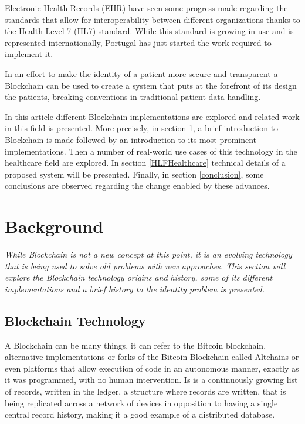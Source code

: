 \documentclass[]{llncs}
\begin{document}
Electronic Health Records (EHR) have seen some progress made regarding the standards that allow for 
interoperability between different organizations thanks to the Health Level 7 (HL7) standard. 
While this standard is growing in use and is represented internationally, Portugal has just started 
the work required to implement it.
\cite{HealthLevel7}

In an effort to make the identity of a patient more secure and transparent a Blockchain can be used to create a 
system that puts at the forefront of its design the patients, breaking conventions in traditional patient data handling.

In this article different Blockchain implementations are explored and related work in this field is presented. 
More precisely, in section \ref{background}, a brief introduction to Blockchain is made followed by an introduction 
to its most prominent implementations. Then a number of real-world use cases of this technology in the healthcare field 
are explored. In section \ref{HLFHealthcare} technical details of a proposed system will be presented. 
Finally, in section \ref{conclusion},  some conclusions are observed regarding the change enabled by these advances.



\section{Background} \label{background}

\textit{While Blockchain is not a new concept at this point, it is an evolving technology that is 
being used to solve old problems with new approaches. This section will explore the Blockchain technology 
origins and history, some of its different implementations and a brief history to the identity problem is presented.}

\subsection{Blockchain Technology}

A Blockchain can be many things, it can refer to the Bitcoin blockchain, alternative implementations 
or forks of the Bitcoin Blockchain called Altchains or even platforms that allow execution of code 
in an autonomous manner, exactly as it was programmed, with no human intervention. 
Is is a continuously growing list of records, written in the ledger, a structure where records are
written, that is being replicated across a network of devices in opposition to having a 
single central record history, making it a good example of a distributed database.
\cite{Wood2017}
  
\end{document}
